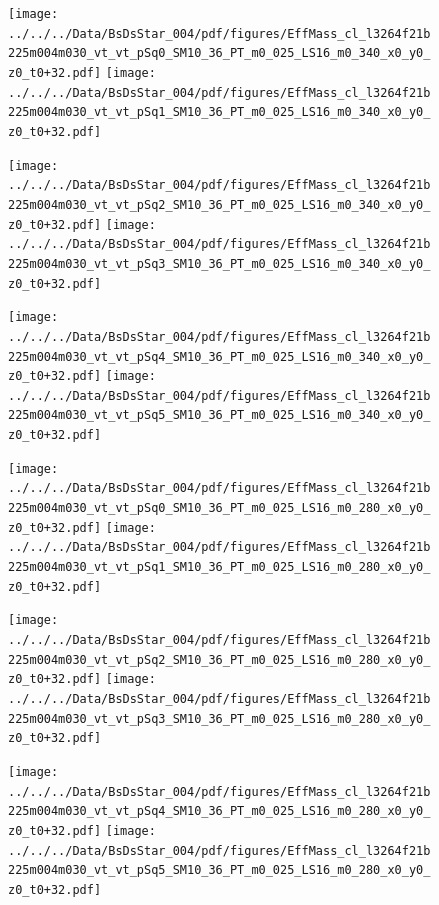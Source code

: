 \documentclass[a4paper,10pt]{article}
\begin{document}
\begin{figure}[p]
 \texttt{[image: ../../../Data/BsDsStar\_004/pdf/figures/EffMass\_cl\_l3264f21b225m004m030\_vt\_vt\_pSq0\_SM10\_36\_PT\_m0\_025\_LS16\_m0\_340\_x0\_y0\_z0\_t0+32.pdf]} 
 \texttt{[image: ../../../Data/BsDsStar\_004/pdf/figures/EffMass\_cl\_l3264f21b225m004m030\_vt\_vt\_pSq1\_SM10\_36\_PT\_m0\_025\_LS16\_m0\_340\_x0\_y0\_z0\_t0+32.pdf]} 
 \end{figure}
\begin{figure}[p]
 \texttt{[image: ../../../Data/BsDsStar\_004/pdf/figures/EffMass\_cl\_l3264f21b225m004m030\_vt\_vt\_pSq2\_SM10\_36\_PT\_m0\_025\_LS16\_m0\_340\_x0\_y0\_z0\_t0+32.pdf]} 
 \texttt{[image: ../../../Data/BsDsStar\_004/pdf/figures/EffMass\_cl\_l3264f21b225m004m030\_vt\_vt\_pSq3\_SM10\_36\_PT\_m0\_025\_LS16\_m0\_340\_x0\_y0\_z0\_t0+32.pdf]} 
 \end{figure}
\begin{figure}[p]
 \texttt{[image: ../../../Data/BsDsStar\_004/pdf/figures/EffMass\_cl\_l3264f21b225m004m030\_vt\_vt\_pSq4\_SM10\_36\_PT\_m0\_025\_LS16\_m0\_340\_x0\_y0\_z0\_t0+32.pdf]} 
 \texttt{[image: ../../../Data/BsDsStar\_004/pdf/figures/EffMass\_cl\_l3264f21b225m004m030\_vt\_vt\_pSq5\_SM10\_36\_PT\_m0\_025\_LS16\_m0\_340\_x0\_y0\_z0\_t0+32.pdf]} 
 \end{figure}
\clearpage
\begin{figure}[p]
 \texttt{[image: ../../../Data/BsDsStar\_004/pdf/figures/EffMass\_cl\_l3264f21b225m004m030\_vt\_vt\_pSq0\_SM10\_36\_PT\_m0\_025\_LS16\_m0\_280\_x0\_y0\_z0\_t0+32.pdf]} 
 \texttt{[image: ../../../Data/BsDsStar\_004/pdf/figures/EffMass\_cl\_l3264f21b225m004m030\_vt\_vt\_pSq1\_SM10\_36\_PT\_m0\_025\_LS16\_m0\_280\_x0\_y0\_z0\_t0+32.pdf]} 
 \end{figure}
\begin{figure}[p]
 \texttt{[image: ../../../Data/BsDsStar\_004/pdf/figures/EffMass\_cl\_l3264f21b225m004m030\_vt\_vt\_pSq2\_SM10\_36\_PT\_m0\_025\_LS16\_m0\_280\_x0\_y0\_z0\_t0+32.pdf]} 
 \texttt{[image: ../../../Data/BsDsStar\_004/pdf/figures/EffMass\_cl\_l3264f21b225m004m030\_vt\_vt\_pSq3\_SM10\_36\_PT\_m0\_025\_LS16\_m0\_280\_x0\_y0\_z0\_t0+32.pdf]} 
 \end{figure}
\begin{figure}[p]
 \texttt{[image: ../../../Data/BsDsStar\_004/pdf/figures/EffMass\_cl\_l3264f21b225m004m030\_vt\_vt\_pSq4\_SM10\_36\_PT\_m0\_025\_LS16\_m0\_280\_x0\_y0\_z0\_t0+32.pdf]} 
 \texttt{[image: ../../../Data/BsDsStar\_004/pdf/figures/EffMass\_cl\_l3264f21b225m004m030\_vt\_vt\_pSq5\_SM10\_36\_PT\_m0\_025\_LS16\_m0\_280\_x0\_y0\_z0\_t0+32.pdf]} 
 \end{figure}
\clearpage
\clearpage
\end{document}
